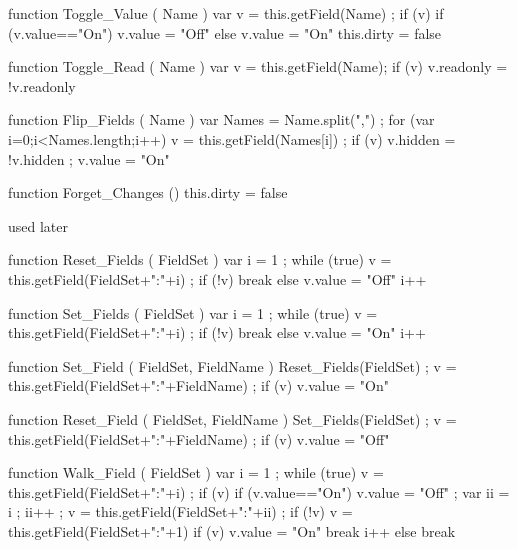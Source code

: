 function Toggle_Value ( Name )
  { var v = this.getField(Name) ;
    if (v)
      { if (v.value=="On")
          { v.value = "Off" }
        else
          { v.value = "On" } } 
   this.dirty = false }

function Toggle_Read ( Name )
  { var v = this.getField(Name);
    if (v) { v.readonly = !v.readonly } }

function Flip_Fields ( Name )
  { var Names = Name.split(",") ;
    for (var i=0;i<Names.length;i++)
      { v = this.getField(Names[i]) ;
        if (v)
          { v.hidden = !v.hidden ;
            v.value = "On" } } }

function Forget_Changes ()
  { this.dirty = false }

\stopJSpreamble

%



 used later

function Reset_Fields ( FieldSet )
  { var i = 1 ;
    while (true)
      { v = this.getField(FieldSet+":"+i) ;
        if (!v)
          { break }
        else
          { v.value = "Off" }
        i++ } }

function Set_Fields ( FieldSet )
  { var i = 1 ;
    while (true)
      { v = this.getField(FieldSet+":"+i) ;
        if (!v)
          { break }
        else
          { v.value = "On" }
        i++ } }

function Set_Field ( FieldSet, FieldName )
  { Reset_Fields(FieldSet) ;
    v = this.getField(FieldSet+":"+FieldName) ;
    if (v) { v.value = "On" } }

function Reset_Field ( FieldSet, FieldName )
  { Set_Fields(FieldSet) ;
    v = this.getField(FieldSet+":"+FieldName) ;
    if (v) { v.value = "Off" } }

function Walk_Field ( FieldSet )
  { var i = 1 ;
    while (true)
      { v = this.getField(FieldSet+":"+i) ;
        if (v)
          { if (v.value=="On")
              { v.value = "Off" ;
                var ii = i ; ii++ ;
                v = this.getField(FieldSet+":"+ii) ;
                if (!v)
                  { v = this.getField(FieldSet+":"+1) }
                if (v)
                  { v.value = "On" }
                break }
            i++ }
        else
          { break } } }

\stopJSpreamble

\endinput
